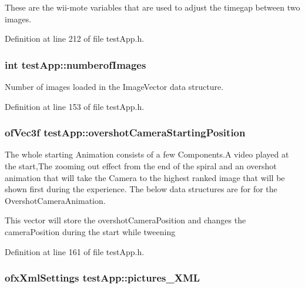 These are the wii-\/mote variables that are used to adjust the timegap between two images. 



Definition at line 212 of file test\-App.\-h.

\hypertarget{classtest_app_a957cf7fdb3ea964a88ca1be13e4d68fc}{
\subsubsection[{numberof\-Images}]{\setlength{\rightskip}{0pt plus 5cm}int test\-App\-::numberof\-Images}}\label{classtest_app_a957cf7fdb3ea964a88ca1be13e4d68fc}


Number of images loaded in the Image\-Vector data structure. 



Definition at line 153 of file test\-App.\-h.

\hypertarget{classtest_app_a846feea7c2c4d4b1929bb72c546b3e19}{
\subsubsection[{overshot\-Camera\-Starting\-Position}]{\setlength{\rightskip}{0pt plus 5cm}of\-Vec3f test\-App\-::overshot\-Camera\-Starting\-Position}}\label{classtest_app_a846feea7c2c4d4b1929bb72c546b3e19}


The whole starting Animation consists of a few Components.\-A video played at the start,The zooming out effect from the end of the spiral and an overshot animation that will take the Camera to the highest ranked image that will be shown first during the experience. The below data structures are for for the Overshot\-Camera\-Animation. 

This vector will store the overshot\-Camera\-Position and changes the camera\-Position during the start while tweening 

Definition at line 161 of file test\-App.\-h.

\hypertarget{classtest_app_a85133f49103cfa002f39d882f7168236}{
\subsubsection[{pictures\-\_\-\-X\-M\-L}]{\setlength{\rightskip}{0pt plus 5cm}ofx\-Xml\-Settings test\-App\-::pictures\-\_\-\-X\-M\-L}}\label{classtest_app_a85133f49103cfa002f39d882f7168236}


